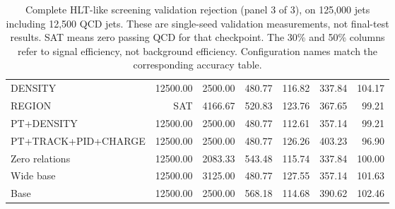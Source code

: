 \begin{table}[htbp]
\begin{tabularx}{\linewidth}{@{}Xrrrrrr@{}}
DENSITY & 12500.00 & 2500.00 & 480.77 & 116.82 & 337.84 & 104.17 \\ %
REGION & SAT & 4166.67 & 520.83 & 123.76 & 367.65 & 99.21 \\ %
PT+DENSITY & 12500.00 & 2500.00 & 480.77 & 112.61 & 357.14 & 99.21 \\ %
PT+TRACK+PID+CHARGE & 12500.00 & 2500.00 & 480.77 & 126.26 & 403.23 & 96.90 \\ %
Zero relations & 12500.00 & 2083.33 & 543.48 & 115.74 & 337.84 & 100.00 \\ %
Wide base & 12500.00 & 3125.00 & 480.77 & 127.55 & 357.14 & 101.63 \\ %
Base & 12500.00 & 2500.00 & 568.18 & 114.68 & 390.62 & 102.46 \\ %
\bottomrule
\end{tabularx}
\caption{Complete HLT-like screening validation rejection (panel 3 of 3),
on 125,000 jets including 12,500 QCD jets. These are single-seed validation measurements, not final-test results.
SAT means zero passing QCD for that checkpoint.
The 30\% and 50\% columns refer to signal efficiency, not background
efficiency. Configuration names match the corresponding accuracy table.}
\label{tab:hlt-screen-rejection-3}
\end{table}
